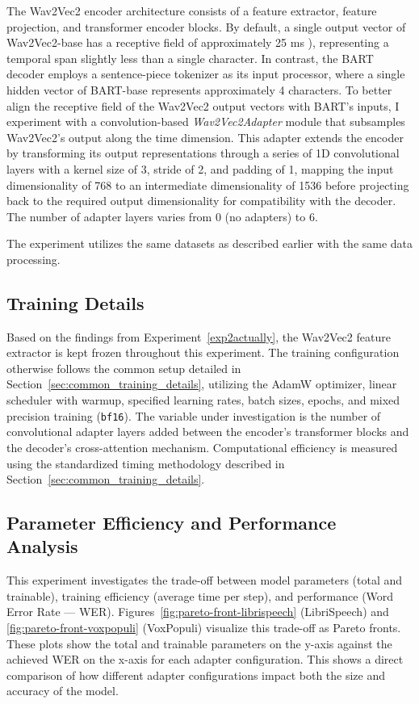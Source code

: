 The Wav2Vec2 encoder architecture consists of a feature extractor, feature projection, and transformer encoder blocks. By default, a single output vector of Wav2Vec2-base has a receptive field of approximately 25 ms \cite{baevski2020wav2vec20frameworkselfsupervised}), representing a temporal span slightly less than a single character. In contrast, the BART decoder employs a sentence-piece tokenizer as its input processor, where a single hidden vector of BART-base represents approximately 4 characters. To better align the receptive field of the Wav2Vec2 output vectors with BART’s inputs, I experiment with a convolution-based \textit{Wav2Vec2Adapter} module that subsamples Wav2Vec2’s output along the time dimension. This adapter extends the encoder by transforming its output representations through a series of 1D convolutional layers with a kernel size of 3, stride of 2, and padding of 1, mapping the input dimensionality of 768 to an intermediate dimensionality of 1536 before projecting back to the required output dimensionality for compatibility with the decoder. The number of adapter layers varies from 0 (no adapters) to 6.

The experiment utilizes the same datasets as described earlier with the same data processing.


\subsection{Training Details}
Based on the findings from Experiment~\ref{exp2actually}, the Wav2Vec2 feature extractor is kept frozen throughout this experiment. The training configuration otherwise follows the common setup detailed in Section~\ref{sec:common_training_details}, utilizing the AdamW optimizer, linear scheduler with warmup, specified learning rates, batch sizes, epochs, and mixed precision training (\texttt{bf16}). The variable under investigation is the number of convolutional adapter layers added between the encoder's transformer blocks and the decoder's cross-attention mechanism. Computational efficiency is measured using the standardized timing methodology described in Section~\ref{sec:common_training_details}.

\subsection{Parameter Efficiency and Performance Analysis}
This experiment investigates the trade-off between model parameters (total and trainable), training efficiency (average time per step), and performance (Word Error Rate — WER).  Figures~\ref{fig:pareto-front-librispeech} (LibriSpeech) and \ref{fig:pareto-front-voxpopuli} (VoxPopuli) visualize this trade-off as Pareto fronts.  These plots show the total and trainable parameters on the y-axis against the achieved WER on the x-axis for each adapter configuration.  This shows a direct comparison of how different adapter configurations impact both the size and accuracy of the model.

